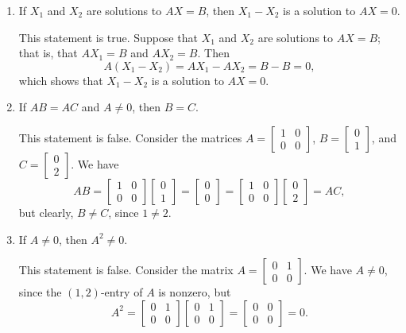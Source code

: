 \documentclass[letterpaper,12pt]{amsart}
\newcommand{\bbm}{\begin{bmatrix}}
\newcommand{\ebm}{\end{bmatrix}}
\begin{document}
\begin{enumerate}
\begin{enumerate}
\bigskip

 \item If $X_1$ and $X_2$ are solutions to $AX=B$, then $X_1-X_2$ is a solution to $AX=0$.

\bigskip

This statement is true. Suppose that $X_1$ and $X_2$ are solutions to $AX=B$; that is, that $AX_1=B$ and $AX_2=B$. Then
\[
 A(X_1-X_2) = AX_1-AX_2 = B-B=0,
\]
which shows that $X_1-X_2$ is a solution to $AX=0$.

\bigskip

 \item If $AB=AC$ and $A\neq 0$, then $B=C$.

\bigskip

This statement is false. Consider the matrices $A = \bbm 1&0\\0&0\ebm$, $B = \bbm 0\\1\ebm$, and $C=\bbm 0\\2\ebm$. We have
\[
 AB = \bbm 1&0\\0&0\ebm\bbm 0\\1\ebm = \bbm 0\\0\ebm = \bbm 1&0\\0&0\ebm\bbm 0\\2\ebm = AC,
\]
but clearly, $B\neq C$, since $1\neq 2$.

\bigskip

 \item If $A\neq 0$, then $A^2\neq 0$.

This statement is false. Consider the matrix $A = \bbm 0&1\\0&0\ebm$. We have $A\neq 0$, since the $(1,2)$-entry of $A$ is nonzero, but
\[
 A^2 = \bbm 0&1\\0&0\ebm\bbm 0&1\\0&0\ebm = \bbm 0&0\\0&0\ebm = 0.
\]

 \end{enumerate}
\end{enumerate}
\end{document}
